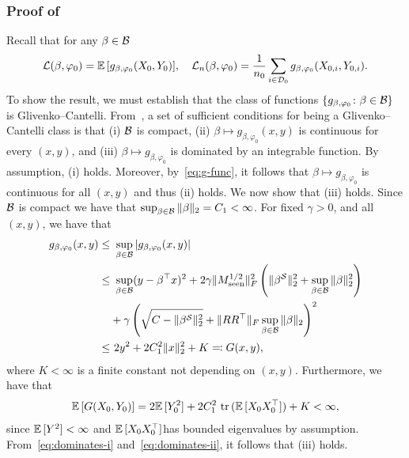 \subsubsection{Proof of }
    Recall that for any $\beta \in \mathcal{B}$
  \begin{align*}
      \mathcal{L}(\beta, \varphi_0) = \mathbb{E}\,[g_{\beta, \varphi_0}(X_0, Y_0)],
      \quad
      \mathcal{L}_n(\beta, \varphi_0) = \frac{1}{n_0}\sum_{i \in \mathcal{D}_0} g_{\beta, \varphi_0}(X_{0,i}, Y_{0,i}).
  \end{align*}
    To show the result, we must establish that the class of functions $\{g_{\beta, \varphi_0} \colon \beta \in \mathcal{B}\}$ is Glivenko--Cantelli. From~\cite{van2000asymptotic}, a set of sufficient conditions for being a Glivenko--Cantelli class is that (i) $\mathcal{B}$ is compact, (ii) $\beta \mapsto g_{\beta, \varphi_0}(x, y)$ is continuous for every $(x, y)$, and (iii) $\beta \mapsto g_{\beta, \varphi_0}$ is dominated by an integrable function.
    By assumption, (i) holds.
    Moreover, by~\eqref{eq:g-func}, it follows that $\beta \mapsto g_{\beta, \varphi_0}$ is continuous for all $(x, y)$ and thus (ii) holds. We now show that (iii) holds. 
    Since $\mathcal{B}$ is compact we have that $\sup_{\beta\in\mathcal{B}} \|\beta\|_2 = C_1 < \infty$.
    For fixed $\gamma > 0$, and all $(x, y)$, we have that
    \begin{align}
    \label{eq:dominates-i}
    \begin{split}
        g_{\beta, \varphi_0}(x, y) 
        \leq &\ \sup_{\beta \in \mathcal{B}} |g_{\beta, \varphi_0}(x, y)|\\
        \leq &\ \sup_{\beta \in \mathcal{B}} (y - \beta^\top x)^2
        +
        2\gamma  \|M_{\mathrm{seen}}^{1/2}\|_F^2 \left(\|\beta^{\mathcal{S}}\|_2^2 + \sup_{\beta \in \mathcal{B}} \|\beta\|_2^2\right)\\
        &+   \gamma \left(\sqrt{C - \|\beta^{\mathcal{S}}\|_2^2} 
        + \|RR^\top\|_F \sup_{\beta\in\mathcal{B}}\|\beta\|_2\right)^2\\
        \leq &\
        2y^2 + 2C_1^2 \|x\|_2^2 + K \eqqcolon G(x, y),
    \end{split}
    \end{align} 
    where $K < \infty$ is a finite constant not depending on $(x, y)$.
    Furthermore, we have that
    \begin{align}\label{eq:dominates-ii}
        \mathbb{E}\,[G(X_0, Y_0)] = 2 \mathbb{E}\,[Y_0^2] + 2C_1^2\ \mathrm{tr}\, (\mathbb{E}\,[X_0X_0^\top]) + K < \infty,
    \end{align}
    since $\mathbb{E}\,[Y^2] < \infty$ and $\mathbb{E}\,[X_0X_0^\top]$has bounded eigenvalues by assumption. From~\eqref{eq:dominates-i} and~\eqref{eq:dominates-ii}, it follows that (iii) holds.


